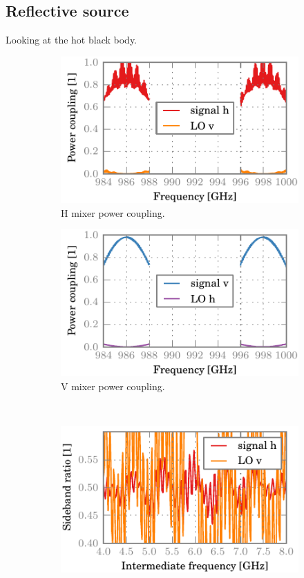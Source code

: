 \clearpage
\subsection{Reflective source}
Looking at the hot black body.
\begin{figure}[hbtp]
    \centering
    \begin{subfigure}[b]{.5\textwidth}
        \includegraphics{chapter_3/14_hbb_h_dsb}%
        \caption{H mixer power coupling.}
    \end{subfigure}%
    \begin{subfigure}[b]{.5\textwidth}
        \includegraphics{chapter_3/14_hbb_v_dsb}%
        \caption{V mixer power coupling.}
    \end{subfigure}%
    \\
    \begin{subfigure}[b]{.5\textwidth}
        \includegraphics{chapter_3/14_hbb_h_sbr}%

\end{subfigure}
\end{figure}
